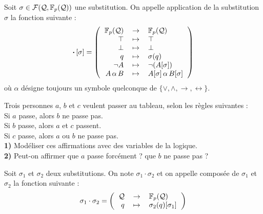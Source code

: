 			\pagebreak
			\eqskip{3mm}
			\begin{Definition}
				Soit \(\sigma \in \mathcal{F}(\mathcal{Q}, \mathbb{F}_p(\mathcal{Q}))\) une substitution. On appelle application de la substitution \(\sigma\) la fonction suivante :
					\[
						\text{\bdot} \![\sigma] = \left( \begin{tabular}[h]{rcl}
							\(\FpQ\) & \(\rightarrow\) & \(\FpQ\) \\
							\(\top\) & \(\mapsto\) & \(\top\) \\
							\(\bot\) & \(\mapsto\) & \(\bot\) \\
							\(q\) & \(\mapsto\) & \(\sigma(q)\) \\
							\(\neg A\) & \(\mapsto\) & \(\neg (A[\sigma])\) \\
							\(A \,\alpha\, B\) & \(\mapsto\) & \(A[\sigma] \,\alpha\, B[\sigma]\)
						\end{tabular} \right)
					\]
				où \(\alpha\) désigne toujours un symbole quelconque de \(\{\vee,\wedge,\rightarrow,\leftrightarrow\}\).
			\end{Definition}
			
			\begin{Exercice}
			Trois personnes \(a\), \(b\) et \(c\) veulent passer au tableau, selon les règles suivantes : \\
			 \bdot Si \(a\) passe, alors \(b\) ne passe pas. \\
			 \bdot Si \(b\) passe, alors \(a\) et \(c\) passent. \\
			 \bdot Si \(c\) passe, alors \(a\) ou \(b\) ne passe pas. \\[2mm]
			\textbf{1)} Modéliser ces affirmations avec des variables de la logique. \\
			\textbf{2)} Peut-on affirmer que \(a\) passe forcément ? que \(b\) ne passe pas ?
			\end{Exercice}
			
			\begin{Correction}
			\end{Correction}
			
			\begin{Definition}
				Soit \(\sigma_1\) et \(\sigma_2\) deux substitutions. On note \(\sigma_1 \cdot \sigma_2\) et on appelle composée de \(\sigma_1\) et \(\sigma_2\) la fonction suivante :
					\[
						\sigma_1 \cdot \sigma_2 = \left( \begin{tabular}[h]{rcl}
							\(\cal{Q}\) & \(\rightarrow\) & \(\FpQ\) \\
							\(q\) & \(\mapsto\) & \(\sigma_2(q)[\sigma_1]\)
						\end{tabular} \right)
					\]
			\end{Definition}
			
